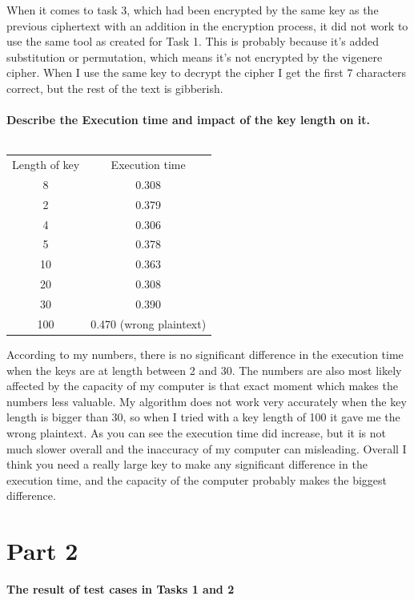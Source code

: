 \documentclass[12pt, letterpaper]{article}
\begin{document}
When it comes to task 3, which had been encrypted by the same key as the previous ciphertext with an addition in the encryption process, it did not work to use the same tool as created for Task 1. This is probably because it's added substitution or permutation, which means it's not encrypted by the vigenere cipher. When I use the same key to decrypt the cipher I get the first 7 characters correct, but the rest of the text is gibberish.
\\ \\
\textbf{Describe the Execution time and impact of the key length on it.}
\\ \\
\begin{center}
\begin{tabular}{ |c|c| } 
 \hline
 Length of key & Execution time \\
 8 & 0.308 \\ 
 2 & 0.379 \\
 4 & 0.306 \\
 5 & 0.378 \\
 10 & 0.363 \\
 20 & 0.308 \\
 30 & 0.390 \\
 100 & 0.470 (wrong plaintext) \\
 \hline
\end{tabular}
\end{center}

According to my numbers, there is no significant difference in the execution time when the keys are at length between 2 and 30. The numbers are also most likely affected by the capacity of my computer is that exact moment which makes the numbers less valuable. My algorithm does not work very accurately when the key length is bigger than 30, so when I tried with a key length of 100 it gave me the wrong plaintext. As you can see the execution time did increase, but it is not much slower overall and the inaccuracy of my computer can misleading. Overall I think you need a really large key to make any significant difference in the execution time, and the capacity of the computer probably makes the biggest difference.
\newpage
\section*{Part 2}
\textbf{The result of test cases in Tasks 1 and 2}
\end{document}
